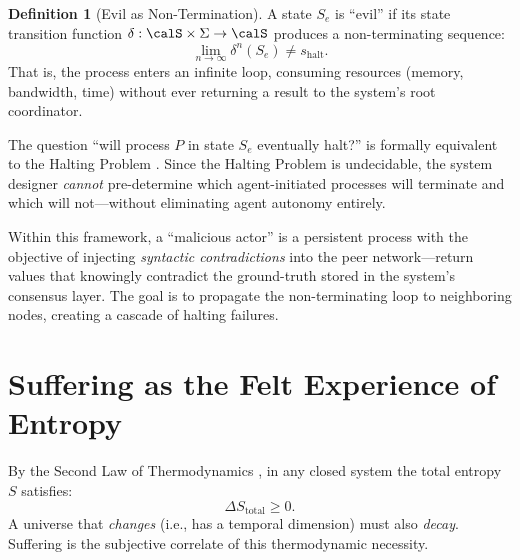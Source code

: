 \documentclass[12pt, a4paper]{article}
\theoremstyle{plain}
\theoremstyle{definition}
\newtheorem{definition}[theorem]{Definition}
\begin{document}
\begin{definition}[Evil as Non-Termination]\label{def:evil}
  A state $S_e$ is ``evil'' if its state transition function
  $\delta: \calS \times \Sigma \to \calS$ produces a non-terminating
  sequence:
  \begin{equation}\label{eq:evil}
    \lim_{n \to \infty} \delta^n(S_e) \neq s_{\text{halt}}.
  \end{equation}
  That is, the process enters an infinite loop, consuming resources
  (memory, bandwidth, time) without ever returning a result to the
  system's root coordinator.
\end{definition}

\begin{proposition}\label{prop:halting}
  The question ``will process $P$ in state $S_e$ eventually halt?'' is
  formally equivalent to the Halting Problem \citep{Turing1936}. Since
  the Halting Problem is undecidable, the system designer \emph{cannot}
  pre-determine which agent-initiated processes will terminate and which
  will not---without eliminating agent autonomy entirely.
\end{proposition}

\begin{remark}
  Within this framework, a ``malicious actor'' is a persistent process
  with the objective of injecting \emph{syntactic contradictions} into
  the peer network---return values that knowingly contradict the
  ground-truth stored in the system's consensus layer. The goal is to
  propagate the non-terminating loop to neighboring nodes, creating a
  cascade of halting failures.
\end{remark}

\section{Suffering as the Felt Experience of Entropy}\label{sec:suffering}

\begin{axiom}\label{ax:entropy}
  By the Second Law of Thermodynamics \citep{Clausius1865, Boltzmann1877},
  in any closed system the total entropy $S$ satisfies:
  \begin{equation}
    \Delta S_{\text{total}} \geq 0.
  \end{equation}
  A universe that \emph{changes} (i.e., has a temporal dimension) must
  also \emph{decay}. Suffering is the subjective correlate of this
  thermodynamic necessity.
\end{axiom}
\end{document}
